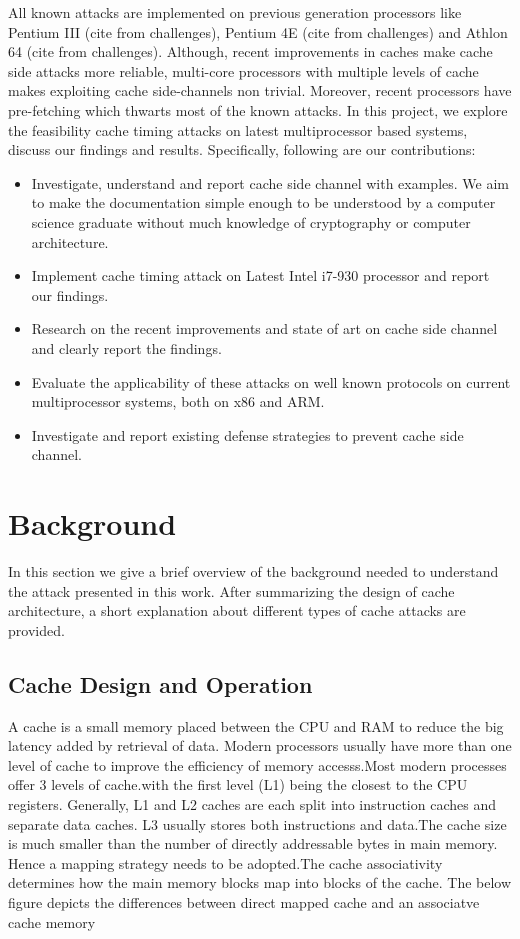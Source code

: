 \documentclass[twocolumn]{IEEEtran}
\begin{document}
All known attacks are implemented on previous generation processors like Pentium III (cite from challenges), Pentium 4E (cite from challenges) and Athlon 64 (cite from challenges). Although, recent improvements in caches make cache side attacks more reliable, multi-core processors with multiple levels of cache makes exploiting cache side-channels non trivial. Moreover, recent processors have pre-fetching\cite{tse1998cpu} which thwarts most of the known attacks. In this project, we explore the feasibility cache timing attacks on latest multiprocessor based systems, discuss our findings and results. Specifically, following are our contributions:
\begin{itemize}
\item Investigate, understand and report cache side channel with examples. We aim to make the documentation simple enough to be understood by a computer science graduate without much knowledge of cryptography or computer architecture.
\item Implement cache timing attack on Latest Intel i7-930 processor and report our findings.
\item Research on the recent improvements and state of art on cache side channel and clearly report the findings.
\item Evaluate the applicability of these attacks on well known protocols on current multiprocessor systems, both on x86 and ARM.
\item Investigate and report existing defense strategies to prevent cache side channel.
\end{itemize}


\section {Background}

In this section we give a brief overview of the background needed to understand the attack presented in this work. After summarizing the design of cache architecture, a short explanation about different types of cache attacks are provided.

\subsection {Cache Design and Operation}

A cache is a small memory placed between the CPU and RAM to reduce the big latency added by retrieval of data. Modern processors usually have more than one level of cache to improve the efficiency of memory accesss.Most modern processes offer 3 levels of cache.with the first level (L1) being the closest to the CPU registers. Generally, L1 and L2 caches are each split into instruction caches and separate data caches. L3 usually stores both instructions and data.The cache size is much smaller than the number of directly addressable bytes in main memory. Hence a mapping strategy needs to be adopted.The cache associativity determines how the main memory blocks map into blocks of the cache. The below figure depicts the differences between direct mapped cache and an associatve cache memory
\end{document}
